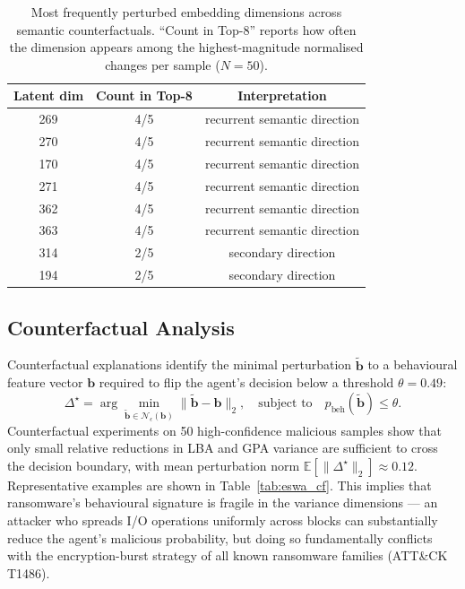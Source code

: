 \begin{table}[ht]
\centering
\caption{Most frequently perturbed embedding dimensions across semantic counterfactuals. ``Count in Top-8'' reports how often the dimension appears among the highest-magnitude normalised changes per sample ($N=50$).}
\label{tab:eswa_sem_cf_dims}
\begin{tabular}{ccc}
\toprule
\textbf{Latent dim} & \textbf{Count in Top-8} & \textbf{Interpretation} \\
\midrule
269 & 4/5 & recurrent semantic direction \\
270 & 4/5 & recurrent semantic direction \\
170 & 4/5 & recurrent semantic direction \\
271 & 4/5 & recurrent semantic direction \\
362 & 4/5 & recurrent semantic direction \\
363 & 4/5 & recurrent semantic direction \\
314 & 2/5 & secondary direction \\
194 & 2/5 & secondary direction \\
\bottomrule
\end{tabular}
\end{table}

\subsection{Counterfactual Analysis}

Counterfactual explanations identify the minimal perturbation $\tilde{\mathbf{b}}$ to a behavioural feature vector $\mathbf{b}$ required to flip the agent's decision below a threshold $\theta = 0.49$:
\begin{equation}
\Delta^\star = \arg\min_{\tilde{\mathbf{b}} \in \mathcal{N}_\epsilon(\mathbf{b})} \|\tilde{\mathbf{b}} - \mathbf{b}\|_2,
\quad \text{subject to} \quad p_\text{beh}(\tilde{\mathbf{b}}) \leq \theta.
\label{eq:eswa_cf}
\end{equation}
Counterfactual experiments on 50 high-confidence malicious samples show that only small relative reductions in LBA and GPA variance are sufficient to cross the decision boundary, with mean perturbation norm $\mathbb{E}[\|\Delta^\star\|_2] \approx 0.12$. Representative examples are shown in Table~\ref{tab:eswa_cf}. This implies that ransomware's behavioural signature is fragile in the variance dimensions — an attacker who spreads I/O operations uniformly across blocks can substantially reduce the agent's malicious probability, but doing so fundamentally conflicts with the encryption-burst strategy of all known ransomware families (ATT\&CK T1486).

